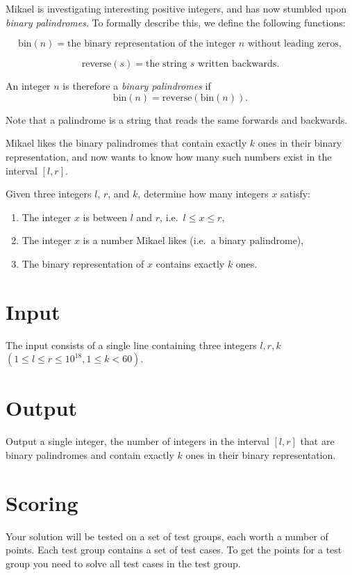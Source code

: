 \noindent

Mikael is investigating interesting positive integers, and has now stumbled upon \emph{binary palindromes}. 
To formally describe this, we define the following functions:

\[
\text{bin}(n) = \text{the binary representation of the integer } n \text{ without leading zeros},
\]

\[
\text{reverse}(s) = \text{the string } s \text{ written backwards}.
\]

An integer $n$ is therefore a \emph{binary palindromes} if
\[
\text{bin}(n) = \text{reverse}(\text{bin}(n)).
\]

Note that a palindrome is a string that reads the same forwards and backwards.

Mikael likes the binary palindromes that contain exactly $k$ ones in their binary representation, 
and now wants to know how many such numbers exist in the interval $[l, r]$.

Given three integers $l$, $r$, and $k$, determine how many integers $x$ satisfy:
\begin{enumerate}
    \item The integer $x$ is between $l$ and $r$, i.e.\ $l \leq x \leq r$,
    \item The integer $x$ is a number Mikael likes (i.e.\ a binary palindrome),
    \item The binary representation of $x$ contains exactly $k$ ones.
\end{enumerate}

\section*{Input}
The input consists of a single line containing three integers $l, r, k$ $(1 \leq l \leq r \leq 10^{18}, 1 \leq k < 60)$.

\section*{Output}
Output a single integer, the number of integers in the interval $[l, r]$ that are binary palindromes and contain exactly $k$ ones in their binary representation.

\section*{Scoring}
Your solution will be tested on a set of test groups, each worth a number of points. 
Each test group contains a set of test cases. 
To get the points for a test group you need to solve all test cases in the test group.

